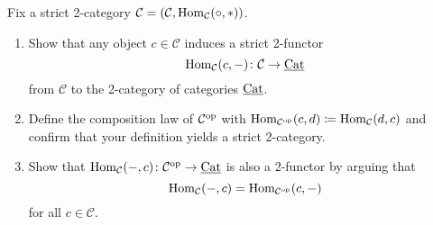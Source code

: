 \begin{Exercise}
	Fix a strict 2-category $ \mathcal{ C } = ( \mathcal{ C } , \operatorname{Hom}_{ \mathcal{ C } } ( \circ , * ) ) $.
	\begin{enumerate}[label=(\alph*)]
		\item 
		Show that any object $ c \in \mathcal{ C } $ induces a strict 2-functor
		\[
		\operatorname{Hom}_{ \mathcal{ C } } ( c , - ) \colon \mathcal{ C } \to \underline{\operatorname{Cat}}
		\]
		from $\mathcal{ C } $ to the 2-category of categories $ \underline{ \operatorname{Cat} } $.
		
		\item 
		Define the composition law of $ \mathcal{ C }^{ \operatorname{op} } $ with $ \operatorname{Hom}_{ \mathcal{ C }^{\operatorname{op} }} ( c , d ) \coloneqq \operatorname{Hom}_{\mathcal{ C } } ( d, c ) $ and confirm that your definition yields a strict 2-category.
		
		\item 
		Show that $ \operatorname{Hom}_{ \mathcal{ C } } ( - , c ) \colon \mathcal{ C }^{ \operatorname{op} } \to \underline{ \operatorname{Cat} }$ is also a 2-functor by arguing that 
		\[
		\operatorname{Hom}_{\mathcal{ C } } ( - , c ) = \operatorname{Hom}_{ \mathcal{ C }^{\operatorname{op}} } ( c , - )
		\]
		for all $ c \in \mathcal{ C } $.
	\end{enumerate}
\end{Exercise}

